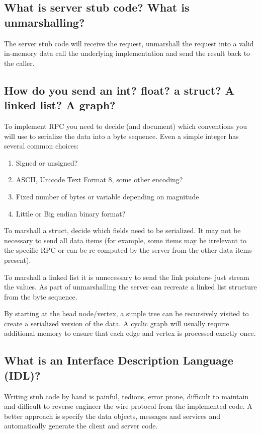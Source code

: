\subsection{What is server stub code? What is unmarshalling?}

The server stub code will receive the request, unmarshall the request into a valid in-memory data call the underlying implementation and send the result back to the caller.

\subsection{How do you send an int? float? a struct? A linked list? A graph?}

To implement RPC you need to decide (and document) which conventions you will use to serialize the data into a byte sequence.
Even a simple integer has several common choices:

\begin{enumerate}
\item Signed or unsigned? 
\item ASCII, Unicode Text Format 8, some other encoding?
\item Fixed number of bytes or variable depending on magnitude 
\item Little or Big endian binary format?
\end{enumerate}

To marshall a struct, decide which fields need to be serialized.
It may not be necessary to send all data items (for example, some items may be irrelevant to the specific RPC or can be re-computed by the server from the other data items present).

To marshall a linked list it is unnecessary to send the link pointers- just stream the values.
As part of unmarshalling the server can recreate a linked list structure from the byte sequence.

By starting at the head node/vertex, a simple tree can be recursively visited to create a serialized version of the data.
A cyclic graph will usually require additional memory to ensure that each edge and vertex is processed exactly once.

\subsection{What is an Interface Description Language (IDL)?}

Writing stub code by hand is painful, tedious, error prone, difficult to maintain and difficult to reverse engineer the wire protocol from the implemented code.
A better approach is specify the data objects, messages and services and automatically generate the client and server code.

